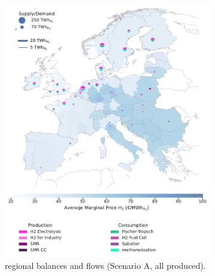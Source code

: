 \documentclass[preprint,12pt]{elsarticle}
\begin{document}
\begin{figure}[!htbp]
  \centering
  \begin{subfigure}[t]{0.47\textwidth}
      \vspace{0pt}
      \includegraphics[width=\textwidth]{balance_map_h2_scenario_a}
      \vspace{0.3cm}
      \vspace{-0.3cm}
      \caption{ regional balances and flows (Scenario A, all  produced).}
      \label{fig:balance_map_h2_scenario_a}
  \end{subfigure}
  \hfill
  \begin{subfigure}[t]{0.47\textwidth}
      \vspace{0pt}

\end{subfigure}
\end{figure}
\end{document}
